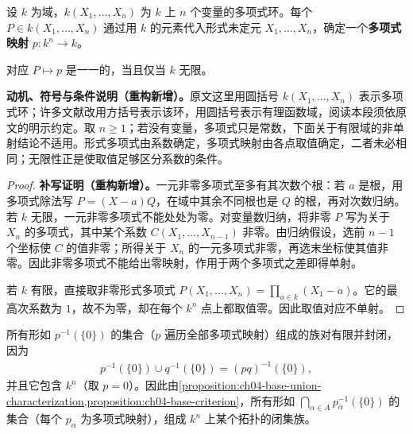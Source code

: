 \documentclass[../../main.tex]{subfiles}%
\begin{document}
\begin{definition}[多项式映射]\label{definition:ch04-polynomial-map}
设 $k$ 为域，$k(X_1,\ldots,X_n)$ 为 $k$ 上 $n$ 个变量的多项式环。每个 $P\in k(X_1,\ldots,X_n)$ 通过用 $k$ 的元素代入形式未定元 $X_1,\ldots,X_n$，确定一个\textbf{多项式映射} $p:k^n\to k$。
\end{definition}
\begin{proposition}\label{proposition:ch04-polynomial-evaluation-injective}
对应 $P\mapsto p$ 是一一的，当且仅当 $k$ 无限。
\end{proposition}
\begin{remark}
\textbf{动机、符号与条件说明（重构新增）。}原文这里用圆括号 $k(X_1,\ldots,X_n)$ 表示多项式环；许多文献改用方括号表示该环，用圆括号表示有理函数域，阅读本段须依原文的明示约定。取 $n\ge1$；若没有变量，多项式只是常数，下面关于有限域的非单射结论不适用。形式多项式由系数确定，多项式映射由各点取值确定，二者未必相同；无限性正是使取值足够区分系数的条件。
\end{remark}
\begin{proof}
\textbf{补写证明（重构新增）。}一元非零多项式至多有其次数个根：若 $a$ 是根，用多项式除法写 $P=(X-a)Q$，在域中其余不同根也是 $Q$ 的根，再对次数归纳。若 $k$ 无限，一元非零多项式不能处处为零。对变量数归纳，将非零 $P$ 写为关于 $X_n$ 的多项式，其中某个系数 $C(X_1,\ldots,X_{n-1})$ 非零。由归纳假设，选前 $n-1$ 个坐标使 $C$ 的值非零；所得关于 $X_n$ 的一元多项式非零，再选末坐标使其值非零。因此非零多项式不能给出零映射，作用于两个多项式之差即得单射。

若 $k$ 有限，直接取非零形式多项式 $P(X_1,\ldots,X_n)=\prod_{a\in k}(X_1-a)$。它的最高次系数为 $1$，故不为零，却在每个 $k^n$ 点上都取值零。因此取值对应不单射。
\end{proof}
所有形如 $p^{-1}(\{0\})$ 的集合（$p$ 遍历全部多项式映射）组成的族对有限并封闭，因为
\begin{align*}
p^{-1}(\{0\})\cup q^{-1}(\{0\})=(pq)^{-1}(\{0\}),
\end{align*}
并且它包含 $k^n$（取 $p=0$）。因此由\cref{proposition:ch04-base-union-characterization,proposition:ch04-base-criterion}，所有形如 $\bigcap_{\alpha\in A}p_\alpha^{-1}(\{0\})$ 的集合（每个 $p_\alpha$ 为多项式映射），组成 $k^n$ 上某个拓扑的闭集族。
\end{document}
